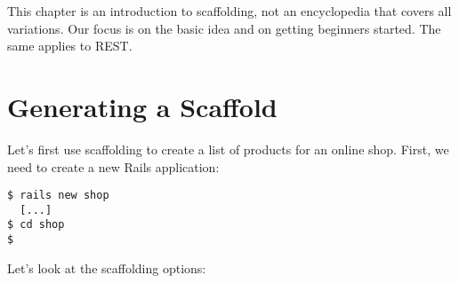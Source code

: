 \documentclass[a4paper]{book}
\begin{document}
This chapter is an introduction to scaffolding, not an encyclopedia that covers all variations. Our focus is on the basic idea and on getting beginners started. The same applies to REST.

\section{Generating a Scaffold}\label{generating-a-scaffold}

Let's first use scaffolding to create a list of products for an online shop. First, we need to create a new Rails application:

\begin{shaded}\begin{verbatim}
$ rails new shop
  [...]
$ cd shop
$
\end{verbatim}\end{shaded}

Let's look at the scaffolding options:
\end{document}
